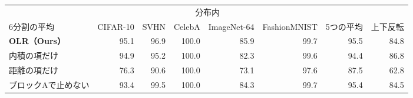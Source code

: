 \documentclass[border=3pt]{standalone}
\begin{document}
%
\begin{tabular}{l*{5}{r}rr}%
\toprule
 & \multicolumn{5}{c}{分布内} & & \\
\cmidrule(lr){2-6}
6分割の平均 & CIFAR-10 & SVHN & CelebA & ImageNet-64 & FashionMNIST & 5つの平均 & 上下反転\\
\midrule
\textbf{OLR（Ours）} & 95.1 & 96.9 & 100.0 & 85.9 & 99.7 & 95.5 & 84.8\\
内積の項だけ & 94.9 & 95.2 & 100.0 & 82.3 & 99.6 & 94.4 & 86.8\\
距離の項だけ & 76.3 & 90.6 & 100.0 & 73.1 & 97.6 & 87.5 & 62.8\\
ブロックAで止めない & 93.4 & 99.5 & 100.0 & 84.3 & 99.7 & 95.4 & 84.5\\
\bottomrule
\end{tabular}%
\end{document}
